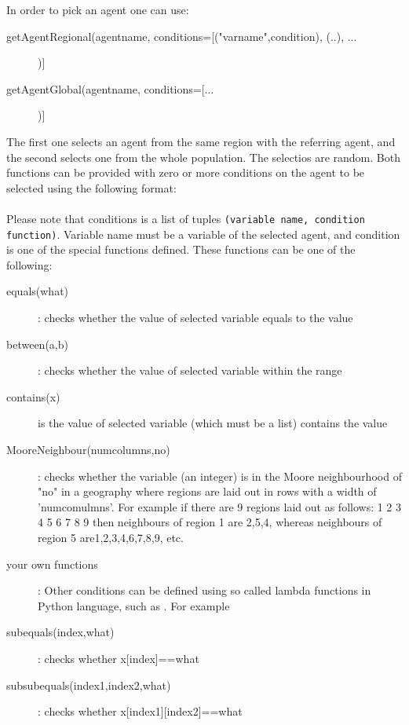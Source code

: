 \documentclass{article}
\begin{document}
In order to pick an agent one can use:
\begin{description}
\item[getAgentRegional(agentname, conditions=[("varname",condition), (..), ...])]
\item[getAgentGlobal(agentname, conditions=[...])]
\end{description}
The first one selects an agent from the same region with the referring agent, and the second selects one from the whole population. The selectios are random. Both functions can be provided with zero or more conditions on the agent to be selected using the following format:\\
\\
Please note that conditions is a list of tuples {\tt (variable name, condition function)}. Variable name must be a variable of the selected agent, and condition is one of the special functions defined. These functions can be one of the following:
\begin{description}
   \item[equals(what)]: checks whether the value of selected variable equals  to the value
   \item[between(a,b)]: checks whether the value of selected variable within the range
   \item[contains(x)] is the value of selected variable (which must be a list) contains the value
   \item[MooreNeighbour(numcolumns,no)]: checks whether the variable (an integer) is in the Moore neighbourhood of "no" in a geography where regions are laid out in rows with a width of 'numcomulmns'. For example if there are 9 regions laid out as follows:
      1    2    3
      4    5    6
      7    8    9
    then neighbours of region 1 are 2,5,4, whereas neighbours of region 5 are1,2,3,4,6,7,8,9, etc.
   \item[your own functions]: Other conditions can be defined using so called lambda functions in Python language, such as  . For example 
   \item[subequals(index,what)]: checks whether x[index]==what
   \item[subsubequals(index1,index2,what)]: checks whether x[index1][index2]==what
\end{description}
\end{document}
